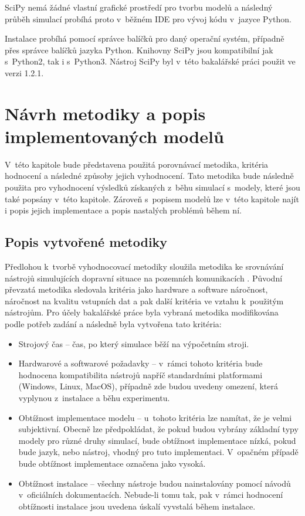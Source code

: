 SciPy nemá žádné vlastní grafické prostředí pro tvorbu modelů a následný průběh simulací probíhá proto v~běžném IDE pro vývoj kódu v~jazyce Python. 

Instalace probíhá pomocí správce balíčků pro daný operační systém, případně přes správce balíčků jazyka Python. Knihovny SciPy jsou kompatibilní jak s~Python2, tak i s~Python3. Nástroj SciPy byl v~této bakalářské práci použit ve verzi 1.2.1.

\chapter{Návrh metodiky a popis implementovaných modelů}
\label{kapitola4}
V~této kapitole bude představena použitá porovnávací metodika, kritéria hodnocení a následné způsoby jejich vyhodnocení. Tato metodika bude následně použita pro vyhodnocení výsledků získaných z~běhu simulací s~modely, které jsou také popsány v~této kapitole. Zároveň s~popisem modelů lze v~této kapitole najít i popis jejich implementace a popis nastalých problémů během ní.

\section{Popis vytvořené metodiky}
\label{metodika}

Předlohou k~tvorbě vyhodnocovací metodiky sloužila metodika ke srovnávání nástrojů simulujících dopravní situace na pozemních komunikacích \cite{jones2004traffic}. Původní převzatá metodika sledovala kritéria jako hardware a software náročnost, náročnost na kvalitu vstupních dat a pak další kritéria ve vztahu k~použitým nástrojům. Pro účely bakalářské práce byla vybraná metodika modifikována podle potřeb zadání a následně byla vytvořena tato kritéria:
\begin{itemize}
    \item Strojový čas -- čas, po který simulace běží na výpočetním stroji.
    \item Hardwarové a softwarové požadavky -- v~rámci tohoto kritéria bude hodnocena kompatibilita nástrojů napříč standardními platformami (Windows, Linux, MacOS), případně zde budou uvedeny omezení, která vyplynou z~instalace a běhu experimentu.
    \item Obtížnost implementace modelu -- u~tohoto kritéria lze namítat, že je velmi subjektivní. Obecně lze předpokládat, že pokud budou vybrány základní typy modely pro různé druhy simulací, bude obtížnost implementace nízká, pokud bude jazyk, nebo nástroj, vhodný pro tuto implementaci. V~opačném případě bude obtížnost implementace označena jako vysoká.
    \item Obtížnost instalace -- všechny nástroje budou nainstalovány pomocí návodů v~oficiálních dokumentacích. Nebude-li tomu tak, pak v~rámci hodnocení obtížnosti instalace jsou uvedena úskalí vyvstalá během instalace.
\end{itemize}

